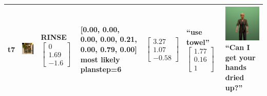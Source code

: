 \begin{longtable}{| V{0.8cm} | V{2.6cm} | V{1.6cm} | V{2.1cm} | V{1.55cm} | V{1.6cm} | V{3.2cm} |}
t7 &
\includegraphics[width=\linewidth]{fig/system/_fast2-rinse3_.jpg} &
RINSE
\linebreak\linebreak
$\begin{bmatrix}
0 \\
1.69 \\
-1.6
\end{bmatrix}$ &
[0.00, 0.00, 0.00, 0.00, 0.21, 0.00, 0.79, 0.00] most likely planstep=6 &
$\begin{bmatrix}
3.27 \\
1.07 \\
-0.58
\end{bmatrix}$ &
``use towel''
\linebreak\linebreak
$\begin{bmatrix}
1.77 \\
0.16 \\
1
\end{bmatrix}$ &
\includegraphics[width=2.6cm]{fig/prompt/_can-i-get-your-hands-dried-up_.jpg}
\linebreak
\footnotesize
``Can I get your hands dried up?''
\\ \hline



\end{longtable}
